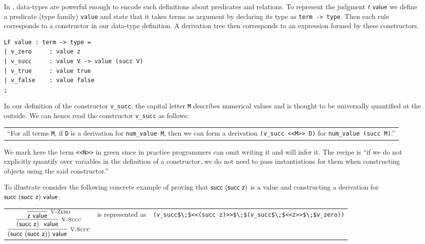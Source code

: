 In \beluga, data-types are powerful enough to encode such definitions
about  predicates  and  relations.  To represent the judgment  $t ~\mathsf{value}$  we
define  a predicate (type family) \lstinline!value!  and state that it takes
terms as argument  by declaring its type as \lstinline!term -> type!.  Then each
rule corresponds to a constructor in our data-type definition. A derivation tree
then corresponds to an expression formed by these constructors.

\begin{lstlisting}
LF value : term -> type =
| v_zero     : value z
| v_succ     : value V -> value (succ V)
| v_true     : value true
| v_false    : value false
;
\end{lstlisting}

In our definition  of  the constructor \lstinline!v_succ!, the  capital  letter
\lstinline!M! describes numerical values and is thought  to be  universally
quantified  at the outside.  We can hence read the constructor \lstinline!v_succ! as follows:

\begin{center}
\begin{tabular}{p{12cm}}
``For  all  terms   \lstinline$M$,   if   \lstinline!D!  is  a  derivation   for
\lstinline!num_value M!,      then      we     can     form     a     derivation
\lstinline!(v_succ <<M>> D)! for \lstinline!num_value (succ M)!.''
\end{tabular}
\end{center}


We mark here  the term \lstinline!<<N>>! in green  since in practice programmers
can omit  writing it  and \beluga  will infer it.  The recipe is  ``if we do not
explicitly quantify over variables in the definition of a constructor, we do not
need  to pass instantiations  for them when constructing objects  using the said
constructor.''


To illustrate consider the following concrete example of proving that
$\textsf{succ}~(\textsf{succ}~\textsf{z})$ is a value and constructing a derivation
for $\textsf{succ}~(\textsf{succ}~\textsf{z}) ~\mathsf{value}$. %
\begin{center}
\begin{tabular}{l@{~}c@{}l}
$
\infer[\VSucc]
  { (\tmsucc (\tmsucc \tmzero)) \Value }
  { \infer[\VSucc]
      { (\tmsucc \tmzero)~\Value }
      { \infer[\VZero]
          {\tmzero \Value}
          {}
      }
  }
$ & 
is represented as &
{\small{
\lstinline!(v_succ$\;$<<(succ z)>>$\;$(v_succ$\;$<<z>>$\;$v_zero))!}}
\end{tabular}  
\end{center}

